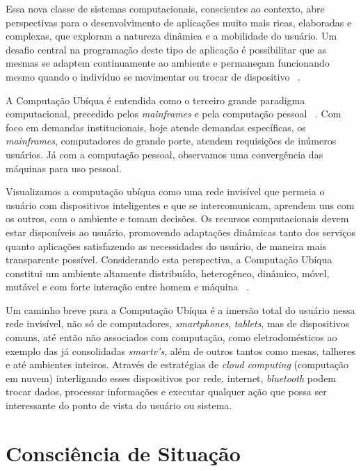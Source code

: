 \documentclass[12pt,a4paper,compsoc]{IEEEtran}
\begin{document}
  Essa nova classe de sistemas computacionais, conscientes ao contexto, abre perspectivas para o
  desenvolvimento de aplicações muito mais ricas, elaboradas e complexas, que exploram a natureza
  dinâmica e a mobilidade do usuário. Um desafio central na programação deste tipo de aplicação é
  possibilitar que as mesmas se adaptem continuamente ao ambiente e permaneçam funcionando mesmo
  quando o indivíduo se movimentar ou trocar de dispositivo ~\cite{GrimmB03, Cac08}.
  
  A Computação Ubíqua é entendida como o terceiro grande paradigma computacional, precedido pelos
  \textit{mainframes} e pela computação pessoal ~\cite{weiser1997}. Com foco em demandas 
  institucionais, hoje atende demandas específicas, os \textit{mainframes}, computadores de grande
  porte, atendem requisições de inúmeros usuários. Já com a computação pessoal, observamos uma
  convergência das máquinas para uso pessoal.
  
  Visualizamos a computação ubíqua como uma rede invisível que permeia o usuário com dispositivos
  inteligentes e que se intercomunicam, aprendem uns com os outros, com o ambiente e tomam
  decisões. Os recursos computacionais devem estar disponíveis ao usuário, promovendo adaptações
  dinâmicas tanto dos serviços quanto aplicações satisfazendo as necessidades do usuário, de 
  maneira mais transparente possível. Considerando esta perspectiva, a Computação Ubíqua constitui
  um ambiente altamente distribuído, heterogêneo, dinâmico, móvel, mutável e com forte interação
  entre homem e máquina ~\cite{Augustin03}.
  
  Um caminho breve para a Computação Ubíqua é a imersão total do usuário nessa rede invisível, não
  só de computadores, \textit{smartphones}, \textit{tablets}, mas de dispositivos comuns, até então
  não associados com computação, como eletrodomésticos ao exemplo das já consolidadas 
  \textit{smartv's}, além de outros tantos como mesas, talheres e até ambientes inteiros. Através
  de estratégias de \textit{cloud computing} (computação em nuvem) interligando esses dispositivos
  por rede, internet, \textit{bluetooth} podem trocar dados, processar informações e executar
  qualquer ação que possa ser interessante do ponto de vista do usuário ou sistema.
  

\section{Consciência de Situação}
\end{document}

